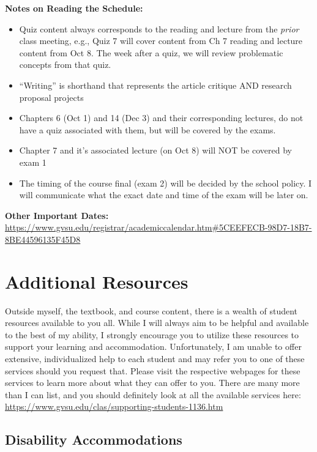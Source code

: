 \documentclass[
  12pt,
  letterpaper,
]{scrartcl}
\begin{document}
\textbf{Notes on Reading the Schedule:}

\begin{itemize}
\item
  Quiz content always corresponds to the reading and lecture from the
  \emph{prior} class meeting, e.g., Quiz 7 will cover content from Ch 7
  reading and lecture content from Oct 8. The week after a quiz, we will
  review problematic concepts from that quiz.
\item
  ``Writing'' is shorthand that represents the article critique AND
  research proposal projects
\item
  Chapters 6 (Oct 1) and 14 (Dec 3) and their corresponding lectures, do
  not have a quiz associated with them, but will be covered by the
  exams.
\item
  Chapter 7 and it's associated lecture (on Oct 8) will NOT be covered
  by exam 1
\item
  The timing of the course final (exam 2) will be decided by the school
  policy. I will communicate what the exact date and time of the exam
  will be later on.
\end{itemize}

\textbf{Other Important Dates:}
\url{https://www.gvsu.edu/registrar/academiccalendar.htm\#5CEEFECB-98D7-18B7-8BE44596135F45D8}

\section{Additional Resources}\label{additional-resources}

Outside myself, the textbook, and course content, there is a wealth of
student resources available to you all. While I will always aim to be
helpful and available to the best of my ability, I strongly encourage
you to utilize these resources to support your learning and
accommodation. Unfortunately, I am unable to offer extensive,
individualized help to each student and may refer you to one of these
services should you request that. Please visit the respective webpages
for these services to learn more about what they can offer to you. There
are many more than I can list, and you should definitely look at all the
available services here:
\url{https://www.gvsu.edu/clas/supporting-students-1136.htm}

\subsection{Disability Accommodations}\label{disability-accommodations}
\end{document}
